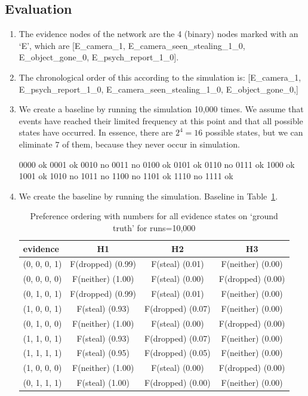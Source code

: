 \documentclass[12pt]{article}
\begin{document}
\subsection{Evaluation}
\begin{enumerate}
\item The evidence nodes of the network are the 4 (binary) nodes marked with an `E', which are [E\_camera\_1, E\_camera\_seen\_stealing\_1\_0, E\_object\_gone\_0, E\_psych\_report\_1\_0].
\item The chronological order of this according to the simulation is:  [E\_camera\_1, E\_psych\_report\_1\_0, E\_camera\_seen\_stealing\_1\_0, E\_object\_gone\_0,]
\item We create a baseline by running the simulation 10,000 times. We assume that events have reached their limited frequency at this point and that all possible states have occurred. In essence, there are $2^4 = 16$ possible states, but we can eliminate $7$ of them, because they never occur in simulation. 

0000 ok
0001 ok
0010 no
0011 no
0100 ok
0101 ok
0110 no
0111 ok
1000 ok
1001 ok
1010 no
1011 no
1100 no
1101 ok
1110 no
1111 ok

\item We create the baseline by running the simulation. Baseline in Table~\ref{heretic}.


\begin{table}[htbp]
\begin{center}
\begin{tabular}{|l|c|c|c|}
\hline
evidence & H1 & H2 & H3 \\
\hline
(0, 0, 0, 1)&F(dropped) (0.99) & F(steal) (0.01) & F(neither) (0.00) \\
(0, 0, 0, 0)&F(neither) (1.00) & F(steal) (0.00) & F(dropped) (0.00) \\
(0, 1, 0, 1)&F(dropped) (0.99) & F(steal) (0.01) & F(neither) (0.00) \\
(1, 0, 0, 1)&F(steal) (0.93) & F(dropped) (0.07) & F(neither) (0.00) \\
(0, 1, 0, 0)&F(neither) (1.00) & F(steal) (0.00) & F(dropped) (0.00) \\
(1, 1, 0, 1)&F(steal) (0.93) & F(dropped) (0.07) & F(neither) (0.00) \\
(1, 1, 1, 1)&F(steal) (0.95) & F(dropped) (0.05) & F(neither) (0.00) \\
(1, 0, 0, 0)&F(neither) (1.00) & F(steal) (0.00) & F(dropped) (0.00) \\
(0, 1, 1, 1)&F(steal) (1.00) & F(dropped) (0.00) & F(neither) (0.00) \\
\hline
\end{tabular}
\end{center}
\caption{ Preference ordering with numbers for all evidence states on `ground truth' for runs=10,000}
\label{heretic}
\end{table}


\end{enumerate}
\end{document}
